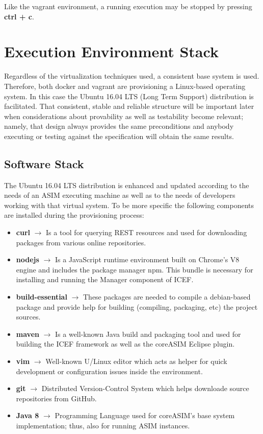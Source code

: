 Like the vagrant environment, a running execution may be stopped by pressing \textbf{ctrl + c}.

\section{Execution Environment Stack}
\label{sec:exec-env-stack}
Regardless of the virtualization techniques used, a consistent base system is used. Therefore, both docker and vagrant are provisioning a Linux-based operating system. In this case the Ubuntu 16.04 LTS (Long Term Support) distribution is facilitated. That consistent, stable and reliable structure will be important later when considerations about provability as well as testability become relevant; namely, that design always provides the same preconditions and anybody executing or testing against the specification will obtain the same results.

\subsection{Software Stack}
\label{sec:env-exec-stack-software-stack}

The Ubuntu 16.04 LTS distribution is enhanced and updated according to the needs of an ASIM executing machine as well as to the needs of developers working with that virtual system. To be more specific the following components are installed during the provisioning process:

\begin{itemize}
	\item \textbf{curl} $\rightarrow$ Is a tool for querying REST resources and used for downloading packages from various online repositories.
	\item \textbf{nodejs} $\rightarrow$ Is a JavaScript runtime environment built on Chrome's V8 engine and includes the package manager npm. This bundle is necessary for installing and running the Manager component of ICEF.
	\item \textbf{build-essential} $\rightarrow$ These packages are needed to compile a debian-based package and provide help for building (compiling, packaging, etc) the project sources.
	\item \textbf{maven} $\rightarrow$ Is a well-known Java build and packaging tool and used for building the ICEF framework as well as the coreASIM Eclipse plugin.
	\item \textbf{vim} $\rightarrow$ Well-known U/Linux editor which acts as helper for quick development or configuration issues inside the environment.
	\item \textbf{git} $\rightarrow$ Distributed Version-Control System which helps downloade source repositories from GitHub.
	\item \textbf{Java 8} $\rightarrow$ Programming Language used for coreASIM's base system implementation; thus, also for running ASIM instances.
\end{itemize}

